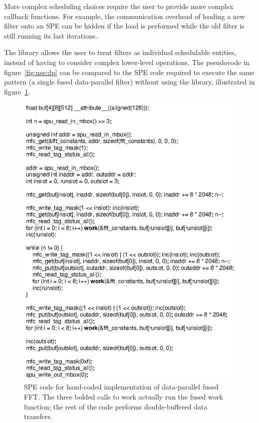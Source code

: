More complex scheduling choices require the user to provide more complex callback functions. For example, the communication overhead of loading a new filter onto an SPE can be hidden if the load is performed while the old filter is still running its last iterations.

The library allows the user to treat filters as individual schedulable entities, instead of having to consider complex lower-level operations. The pseudocode in figure~\ref{fig:use:dp} can be compared to the SPE code required to execute the same pattern (a single fused data-parallel filter) without using the library, illustrated in figure~\ref{fig:use:handcode}.

\begin{figure}[!htb]
\begin{center}
\includegraphics{figs/handcode}
\end{center}
\caption[SPE code for hand-coded implementation of data-parallel fused FFT.]{SPE code for hand-coded implementation of data-parallel fused FFT. The three bolded calls to \textsf{work} actually run the fused work function; the rest of the code performs double-buffered data transfers.}
\label{fig:use:handcode}
\end{figure}

